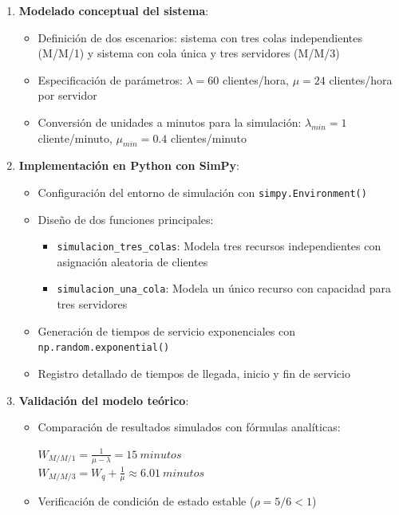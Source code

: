 \documentclass{article}
\begin{document}
\begin{enumerate}
    \item \textbf{Modelado conceptual del sistema}:
        \begin{itemize}
            \item Definición de dos escenarios: sistema con tres colas independientes (M/M/1) y sistema con cola única y tres servidores (M/M/3)
            \item Especificación de parámetros: $\lambda = 60$ clientes/hora, $\mu = 24$ clientes/hora por servidor
            \item Conversión de unidades a minutos para la simulación: $\lambda_{min} = 1$ cliente/minuto, $\mu_{min} = 0.4$ clientes/minuto
        \end{itemize}

    \item \textbf{Implementación en Python con SimPy}:
        \begin{itemize}
            \item Configuración del entorno de simulación con \texttt{simpy.Environment()}
            \item Diseño de dos funciones principales:
                \begin{itemize}
                    \item \texttt{simulacion\_tres\_colas}: Modela tres recursos independientes con asignación aleatoria de clientes
                    \item \texttt{simulacion\_una\_cola}: Modela un único recurso con capacidad para tres servidores
                \end{itemize}
            \item Generación de tiempos de servicio exponenciales con \texttt{np.random.exponential()}
            \item Registro detallado de tiempos de llegada, inicio y fin de servicio
        \end{itemize}

    \item \textbf{Validación del modelo teórico}:
    \begin{itemize}
        \item Comparación de resultados simulados con fórmulas analíticas:
            \begin{center}
                $W_{M/M/1} = \frac{1}{\mu - \lambda} = 15\ minutos$ \\
                $W_{M/M/3} = W_q + \frac{1}{\mu} \approx 6.01\ minutos$
            \end{center}
        \item Verificación de condición de estado estable ($\rho = 5/6 < 1$)
    \end{itemize}


\end{enumerate}
\end{document}
